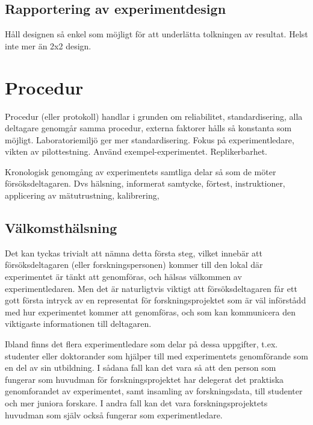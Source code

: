 \documentclass[
]{book}
\begin{document}
\hypertarget{sub07.5.10}{%
\subsection{Rapportering av experimentdesign}\label{sub07.5.10}}

Håll designen så enkel som möjligt för att underlätta tolkningen av resultat. Helst inte mer än 2x2 design.

\hypertarget{sec07.6}{%
\section{Procedur}\label{sec07.6}}

Procedur (eller protokoll) handlar i grunden om reliabilitet, standardisering, alla deltagare genomgår samma procedur, externa faktorer hålls så konstanta som möjligt. Laboratoriemiljö ger mer standardisering. Fokus på experimentledare, vikten av pilottestning. Använd exempel-experimentet. Replikerbarhet.

Kronologisk genomgång av experimentets samtliga delar så som de möter försöksdeltagaren. Dvs hälsning, informerat samtycke, förtest, instruktioner, applicering av mätutrustning, kalibrering,

\hypertarget{sub07.6.1}{%
\subsection{Välkomsthälsning}\label{sub07.6.1}}

Det kan tyckas trivialt att nämna detta första steg, vilket innebär att försöksdeltagaren (eller forskningspersonen) kommer till den lokal där experimentet är tänkt att genomföras, och hälsas välkommen av experimentledaren. Men det är naturligtvis viktigt att försöksdeltagaren får ett gott första intryck av en representat för forskningsprojektet som är väl införstådd med hur experimentet kommer att genomföras, och som kan kommunicera den viktigaste informationen till deltagaren.

Ibland finns det flera experimentledare som delar på dessa uppgifter, t.ex. studenter eller doktorander som hjälper till med experimentets genomförande som en del av sin utbildning. I sådana fall kan det vara så att den person som fungerar som huvudman för forskningsprojektet har delegerat det praktiska genomforandet av experimentet, samt insamling av forskningsdata, till studenter och mer juniora forskare. I andra fall kan det vara forskningsprojektets huvudman som själv också fungerar som experimentledare.
\end{document}
